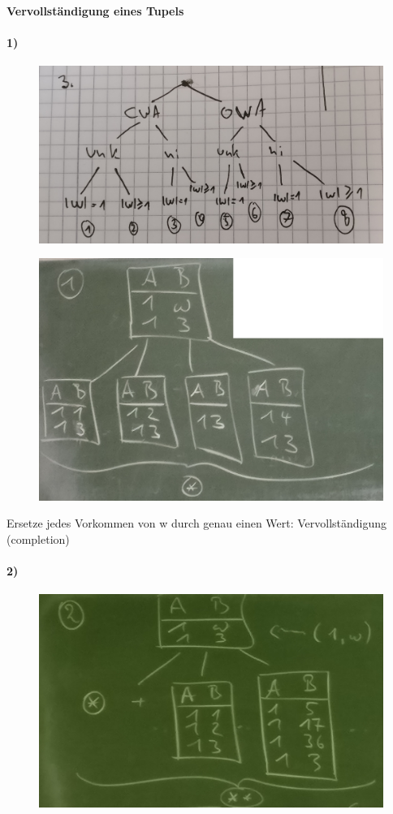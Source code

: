 \documentclass[12pt, a4paper]{article}
\begin{document}
\paragraph{Vervollständigung eines Tupels}
\paragraph{1)}
\begin{figure}
\centering
\includegraphics[width=0.7\linewidth]{img/img32}
\caption{}
\label{fig:img32}
\end{figure}

\begin{figure}
\centering
\includegraphics[width=0.7\linewidth]{img/img33}
\caption{}
\label{fig:img33}
\end{figure}

Ersetze jedes Vorkommen von w durch genau einen Wert: Vervollständigung (completion)

\paragraph{2)}
\begin{figure}
\centering
\includegraphics[width=0.7\linewidth]{img/img34}
\caption{}
\label{fig:img34}
\end{figure}
\end{document}
